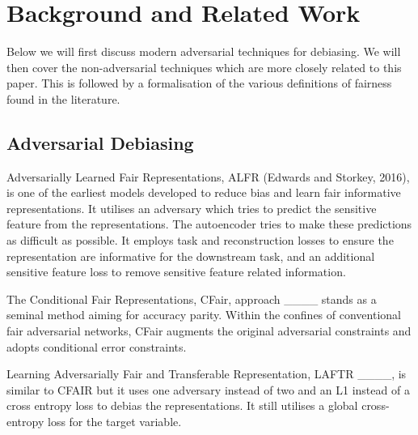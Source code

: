 \section{Background and Related Work}
\label{sec:background}
Below we will first discuss modern adversarial techniques for debiasing. We will then cover the non-adversarial techniques which are more closely related to this paper. This is followed by a formalisation of the various definitions of fairness found in the literature.

\subsection{Adversarial Debiasing}

Adversarially Learned Fair Representations, ALFR (Edwards and Storkey, 2016), is one of the earliest models developed to reduce bias and learn fair informative representations. It utilises an adversary which tries to predict the sensitive feature from the representations. The autoencoder tries to make these predictions as difficult as possible. It employs task and reconstruction losses to ensure the representation are informative for the downstream task, and an additional sensitive feature loss to remove sensitive feature related information.

The Conditional Fair Representations, CFair, approach ____ stands as a seminal method aiming for accuracy parity. Within the confines of conventional fair adversarial networks, CFair augments the original adversarial constraints and adopts conditional error constraints. 

Learning Adversarially Fair and Transferable Representation, LAFTR ____, is similar to CFAIR but it uses one adversary instead of two and an L1 instead of a cross entropy loss to debias the representations. It still utilises a global cross-entropy loss for the target variable.


